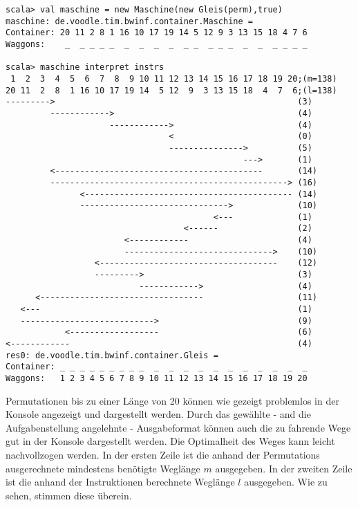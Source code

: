 \begin{lstlisting}
scala> val maschine = new Maschine(new Gleis(perm),true)      
maschine: de.voodle.tim.bwinf.container.Maschine = 
Container: 20 11 2 8 1 16 10 17 19 14 5 12 9 3 13 15 18 4 7 6
Waggons:    _  _ _ _ _  _  _  _  _  _ _  _ _ _  _  _  _ _ _ _

scala> maschine interpret instrs
 1  2  3  4  5  6  7  8  9 10 11 12 13 14 15 16 17 18 19 20;(m=138)
20 11  2  8  1 16 10 17 19 14  5 12  9  3 13 15 18  4  7  6;(l=138)
--------->                                                 (3)
         ------------>                                     (4)
                     ------------>                         (4)
                                 <                         (0)
                                 --------------->          (5)
                                                --->       (1)
         <------------------------------------------       (14)
         ------------------------------------------------> (16)
               <------------------------------------------ (14)
               ------------------------------>             (10)
                                          <---             (1)
                                    <------                (2)
                        <------------                      (4)
                        ------------------------------>    (10)
                  <------------------------------------    (12)
                  --------->                               (3)
                           ------------>                   (4)
      <---------------------------------                   (11)
   <---                                                    (1)
   --------------------------->                            (9)
            <------------------                            (6)
<------------                                              (4)
res0: de.voodle.tim.bwinf.container.Gleis = 
Container: _ _ _ _ _ _ _ _ _  _  _  _  _  _  _  _  _  _  _  _
Waggons:   1 2 3 4 5 6 7 8 9 10 11 12 13 14 15 16 17 18 19 20
\end{lstlisting}
Permutationen bis zu einer Länge von 20 können wie gezeigt problemlos in der Konsole angezeigt und dargestellt werden.
Durch das gewählte - and die Aufgabenstellung angelehnte - Ausgabeformat können auch die zu fahrende Wege gut in der Konsole dargestellt werden.
Die Optimalheit des Weges kann leicht nachvollzogen werden.
In der ersten Zeile ist die anhand der Permutations ausgerechnete mindestens benötigte Weglänge $m$ ausgegeben.
In der zweiten Zeile ist die anhand der Instruktionen berechnete Weglänge $l$ ausgegeben. Wie zu sehen, stimmen diese überein.
